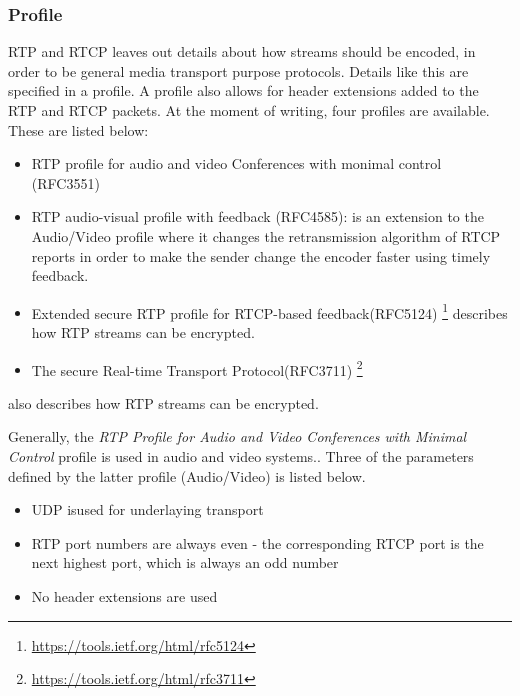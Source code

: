 \subsubsection{Profile} \label{sec:design:profile}
RTP and RTCP leaves out details about how streams should be encoded, in order to be general media transport purpose protocols. Details like this are specified in a profile. A profile also allows for header extensions added to the RTP and RTCP packets.
At the moment of writing, four profiles are available. These are listed below:
\begin{itemize}
	\item RTP profile for audio and video Conferences with monimal control (RFC3551)
	
	\item RTP audio-visual profile with feedback (RFC4585):  is an extension to the Audio/Video profile where it changes the retransmission algorithm of RTCP reports in order to make the sender change the encoder faster using timely feedback.
	
	\item Extended secure RTP profile for RTCP-based feedback(RFC5124) \footnote{\url{https://tools.ietf.org/html/rfc5124}} describes how RTP streams can be encrypted.
	 
	\item The secure Real-time Transport Protocol(RFC3711) \footnote{\url{https://tools.ietf.org/html/rfc3711}}
\end{itemize} \citep{johnston2004sip} also describes how RTP streams can be encrypted.


\noindent  Generally, the \textit{RTP Profile for Audio and Video Conferences with Minimal Control} profile is used in audio and video systems.\citep{perkins2003rtp}.
Three of the parameters defined by the latter profile (Audio/Video) is listed below.
\begin{itemize}
	\item UDP isused for underlaying transport
	\item RTP port numbers are always even - the corresponding RTCP port is the next highest port, which is always an odd number
	\item No header extensions are used
\end{itemize} \citep{johnston2004sip}


